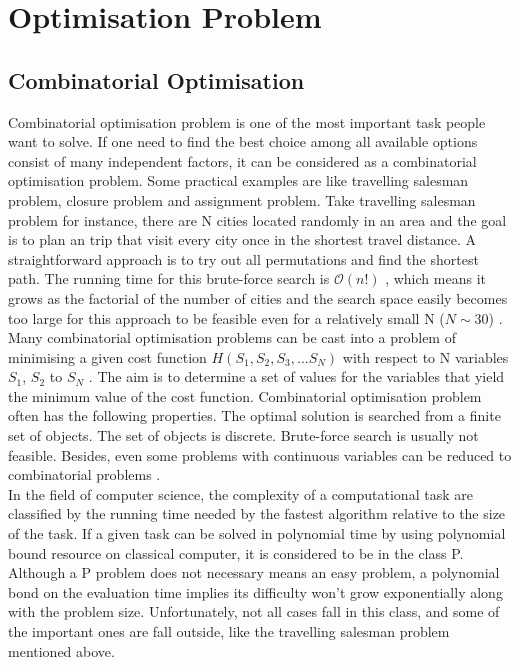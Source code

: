 \documentclass[twoside,a4paper,article]{combine}
\begin{document}
\section{Optimisation Problem}
\subsection{Combinatorial Optimisation}

Combinatorial optimisation problem is one of the most important task people want to solve. If one need to find the best choice among all available options consist of many independent factors, it can be considered as a combinatorial optimisation problem. Some practical examples are like travelling salesman problem, closure problem and assignment problem. Take travelling salesman problem for instance, there are N cities located randomly in an area and the goal is to plan an trip that visit every city once in the shortest travel distance. A straightforward approach is to try out all permutations and find the shortest path. The running time for this brute-force search is $\mathcal{O}(n!)$ , which means it grows as the factorial of the number of cities and the search space easily becomes too large for this approach to be feasible even for a relatively small N ($N \sim 30$) \cite{Santoro2006}. \\

Many combinatorial optimisation problems can be cast into a problem of minimising a given cost function $H(S_1,S_2,S_3,...S_N)$ with respect to N variables $S_1$, $S_2$ to $S_N$ \cite{Das2008}. The aim is to determine a set of values for the variables that yield the minimum value of the cost function. Combinatorial optimisation problem often has the following properties. The optimal solution is searched from a finite set of objects. The set of objects is discrete. Brute-force search is usually not feasible. Besides, even some problems with continuous variables can be reduced to combinatorial problems \cite{Papadimitriou1984}. \\

In the field of computer science, the complexity of a computational task are classified by the running time needed by the fastest algorithm relative to the size of the task. If a given task can be solved in polynomial time by using polynomial bound resource on classical computer, it is considered to be in the class P. Although a P problem does not necessary means an easy problem, a polynomial bond on the evaluation time implies its difficulty won't grow exponentially along with the problem size. Unfortunately, not all cases fall in this class, and some of the important ones are fall outside, like the travelling salesman problem mentioned above.\\
\end{document}
